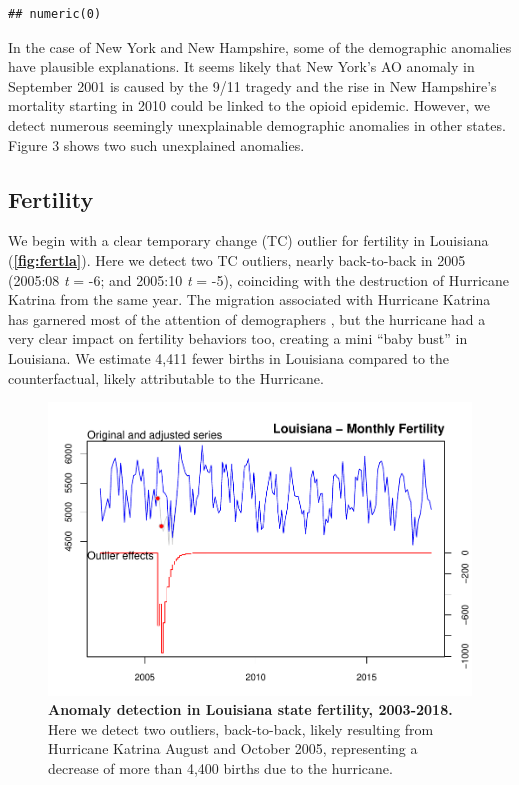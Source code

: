 \documentclass[12pt]{article}
\begin{document}
\begin{verbatim}
## numeric(0)
\end{verbatim}

In the case of New York and New Hampshire, some of the demographic
anomalies have plausible explanations. It seems likely that New York's
AO anomaly in September 2001 is caused by the 9/11 tragedy and the rise
in New Hampshire's mortality starting in 2010 could be linked to the
opioid epidemic. However, we detect numerous seemingly unexplainable
demographic anomalies in other states. Figure 3 shows two such
unexplained anomalies.

\hypertarget{fertility}{%
\subsection{Fertility}\label{fertility}}

We begin with a clear temporary change (TC) outlier for fertility in
Louisiana (\textbf{\autoref{fig:fertla}}). Here we detect two TC
outliers, nearly back-to-back in 2005 (2005:08 \emph{t} = -6; and
2005:10 \emph{t} = -5), coinciding with the destruction of Hurricane
Katrina from the same year. The migration associated with Hurricane
Katrina has garnered most of the attention of demographers
\citep{fussellRecoveryMigrationCity2014, horiDisplacementDynamicsSouthern2009},
but the hurricane had a very clear impact on fertility behaviors too,
creating a mini ``baby bust'' in Louisiana. We estimate 4,411 fewer
births in Louisiana compared to the counterfactual, likely attributable
to the Hurricane.

\begin{figure}
\centering
\includegraphics{manuscript_files/figure-latex/FertilityLouisiana-1.pdf}
\caption{\textbf{Anomaly detection in Louisiana state fertility, 2003-2018.}
Here we detect two outliers, back-to-back, likely resulting from
Hurricane Katrina August and October 2005, representing a decrease of
more than 4,400 births due to the hurricane. \label{fig:fertla}}
\end{figure}
\end{document}
